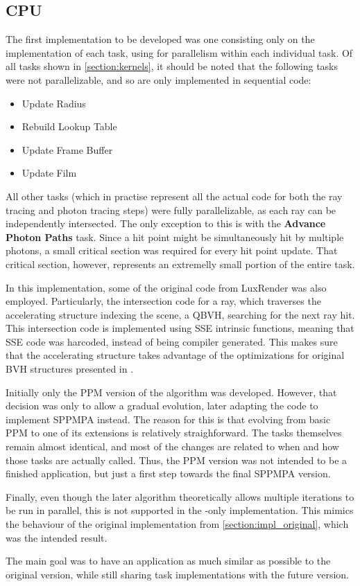 \documentclass[main.tex]{subfiles}
\begin{document}
\subsection{CPU} \label{section:impl_cpu}

The first implementation to be developed was one consisting only on the implementation of each task, using \openmp for parallelism within each individual task. Of all tasks shown in \cref{section:kernels}, it should be noted that the following tasks were not parallelizable, and so are only implemented in sequential code:
\begin{itemize}
  \item Update Radius
  \item Rebuild Lookup Table
  \item Update Frame Buffer
  \item Update Film
\end{itemize}

All other tasks (which in practise represent all the actual code for both the ray tracing and photon tracing steps) were fully parallelizable, as each ray can be independently intersected. The only exception to this is with the \textbf{Advance Photon Paths} task. Since a hit point might be simultaneously hit by multiple photons, a small critical section was required for every hit point update. That critical section, however, represents an extremelly small portion of the entire task.

In this implementation, some of the original code from LuxRender was also employed. Particularly, the intersection code for a ray, which traverses the accelerating structure indexing the scene, a \acf{QBVH}, searching for the next ray hit.
This intersection code is implemented using SSE intrinsic functions, meaning that SSE code was harcoded, instead of being compiler generated. This makes sure that the accelerating structure takes advantage of the optimizations for original \acs{BVH} structures presented in \cite{dammertz2008shallow}.


Initially only the PPM version of the algorithm was developed. However, that decision was only to allow a gradual evolution, later adapting the code to implement SPPMPA instead. The reason for this is that evolving from basic PPM to one of its extensions is relatively straighforward. The tasks themselves remain almost identical, and most of the changes are related to when and how those tasks are actually called. Thus, the PPM version was not intended to be a finished application, but just a first step towards the final SPPMPA version.

Finally, even though the later algorithm theoretically allows multiple iterations to be run in parallel, this is not supported in the \cpu-only implementation. This mimics the behaviour of the original implementation from \cref{section:impl_original}, which was the intended result.

The main goal was to have an application as much similar as possible to the original \cpu version, while still sharing task implementations with the future \starpu version.
\end{document}
